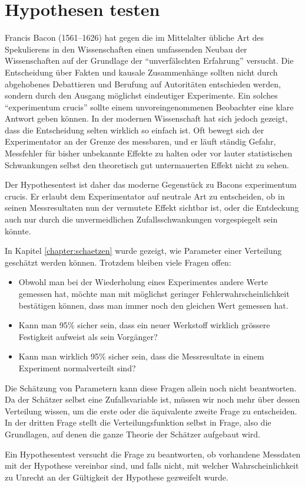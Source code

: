 %
%
%
\chapter{Hypothesen testen}
\label{chapter:hypothesen-testen}
Francis Bacon (1561--1626) hat gegen die im Mittelalter übliche
Art des Spekulierens in den Wissenschaften einen umfassenden Neubau
der Wissenschaften auf der Grundlage der ``unverfälschten Erfahrung''
versucht.
Die Entscheidung über Fakten und kausale Zusammenhänge
sollten nicht durch abgehobenes Debattieren und Berufung auf 
Autoritäten entschieden werden, sondern durch den Ausgang
möglichst eindeutiger Experimente.
Ein solches ``experimentum crucis''
sollte einem unvoreingenommenen Beobachter eine klare Antwort geben
können.
In der modernen Wissenschaft hat sich jedoch gezeigt, dass
die Entscheidung selten wirklich so einfach ist.
Oft bewegt sich
der Experimentator an der Grenze des messbaren, und er läuft
ständig Gefahr, Messfehler für bisher unbekannte Effekte zu halten
oder vor lauter statistischen Schwankungen selbst den theoretisch
gut untermauerten Effekt nicht zu sehen.

Der Hypothesentest ist daher das moderne Gegenstück zu Bacons
experimentum crucis.
Er erlaubt dem Experimentator auf neutrale
Art zu entscheiden, ob in seinen Messresultaten nun der vermutete
Effekt sichtbar ist, oder die Entdeckung auch nur durch die unvermeidlichen
Zufallsschwankungen vorgespiegelt sein könnte.

In Kapitel \ref{chapter:schaetzen} wurde gezeigt, wie Parameter einer
Verteilung geschätzt werden können.
Trotzdem bleiben viele Fragen offen:
\begin{itemize}
\item Obwohl man bei der Wiederholung eines Experimentes andere Werte
gemessen hat, möchte man mit möglichst geringer Fehlerwahrscheinlichkeit
bestätigen können, dass man immer noch den gleichen Wert gemessen hat.
\item Kann man 95\% sicher sein, dass ein neuer Werkstoff wirklich grössere
Festigkeit aufweist als sein Vorgänger?
\item Kann man wirklich 95\% sicher sein, dass die Messresultate
in einem Experiment normalverteilt sind?
\end{itemize}
Die Schätzung von Parametern kann diese Fragen allein noch nicht beantworten.
Da der Schätzer selbst eine Zufallsvariable ist, müssen wir noch
mehr über dessen Verteilung wissen, um die erste oder die äquivalente
zweite Frage zu entscheiden.
In der dritten Frage stellt die
Verteilungsfunktion selbst in Frage, also die Grundlagen, auf denen
die ganze Theorie der Schätzer aufgebaut wird.

Ein Hypothesentest versucht die Frage zu beantworten, ob vorhandene
Messdaten mit der Hypothese vereinbar sind, und falls nicht, mit welcher
Wahrscheinlichkeit zu Unrecht an der Gültigkeit der Hypothese gezweifelt
wurde.








